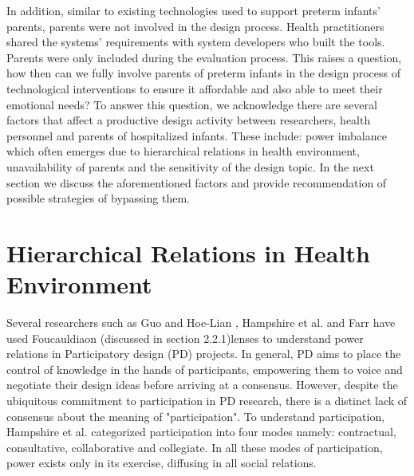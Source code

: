In addition, similar to existing technologies used to support preterm infants' parents, parents were not involved in the design process. Health practitioners shared the systems' requirements with system developers who built the tools. Parents were only included during the evaluation process. This raises a question, how then can we fully involve parents of preterm infants in the design process of technological interventions to ensure it affordable and also able to meet their emotional needs? To answer this question, we acknowledge there are several factors that affect a productive design activity between researchers, health personnel and parents of hospitalized infants. These include: power imbalance which often emerges due to hierarchical relations in health environment, unavailability of parents and the sensitivity of the design topic. In the next section we discuss the aforementioned factors and provide recommendation of possible strategies of bypassing them.

\section {Hierarchical Relations in Health Environment}
Several researchers such as Guo and Hoe-Lian \citep{Guo2014}, Hampshire et al. \citep{Hampshire2015} and Farr \citep{Farr2017a} have used Foucauldiaon (discussed in section 2.2.1)lenses to understand power relations in Participatory design (PD) projects. In general, PD aims to place the control of knowledge in the hands of participants, empowering them to voice and negotiate their design ideas before arriving at a consensus. However, despite the ubiquitous commitment to  participation in PD research, there is a distinct lack of consensus about the meaning of "participation". To understand participation, Hampshire et al. \citep{Hampshire2015} categorized participation into four modes namely: contractual, consultative, collaborative and collegiate. In all these modes of participation, power exists only in its exercise, diffusing in all social relations. 

